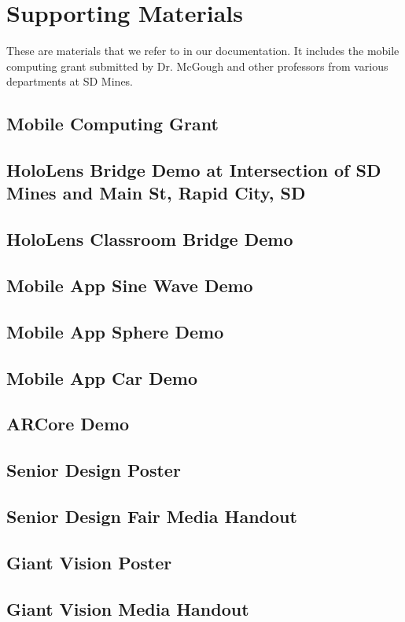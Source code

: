 \chapter{Supporting Materials}
\label{ch:support}

These are materials that we refer to in our documentation. It includes the 
mobile computing grant submitted by Dr. McGough and other professors from 
various departments at SD Mines.


\section{Mobile Computing Grant}
\label{F:F-1}

\section{HoloLens Bridge Demo at Intersection of SD Mines and Main St, Rapid City, SD}


\section{HoloLens Classroom Bridge Demo}



\section{Mobile App Sine Wave Demo}


\section{Mobile App Sphere Demo}


\section{Mobile App Car Demo}


\section{ARCore Demo}


\section{Senior Design Poster}


\section{Senior Design Fair Media Handout}


\section{Giant Vision Poster}


\section{Giant Vision Media Handout}
 